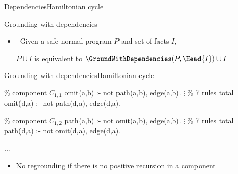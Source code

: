 \begin{frame}[shrink]{Dependencies}{Hamiltonian cycle}
  \begin{center}
    \DepGraph
  \end{center}
\end{frame}
\begin{frame}{Grounding with dependencies}
  \bigskip
  \begin{center}
  \end{center}
  \bigskip
  \begin{itemize}
  \item<2->  \ Given a safe normal program \(P\) and set of facts \(I\),

    \(P \cup I\) is equivalent to \(\GroundWithDependencies(P,\Head{I}) \cup I\)
  \end{itemize}
\end{frame}
\begin{frame}{Grounding with dependencies}{Hamiltonian cycle}
\begin{SemiVerbatim}{.9}
{\color{comment}\% component \(C_{1,1}\)}
omit(a,b) :- not path(a,b), \alert{edge(a,b)}.
          \(\vdots\) {\color{comment}\% 7 rules total}
omit(d,a) :- not path(d,a), \alert{edge(d,a)}.

{\color{comment}\% component \(C_{1,2}\)}
path(a,b) :- not omit(a,b), \alert{edge(a,b)}.
          \(\vdots\) {\color{comment}\% 7 rules total}
path(d,a) :- not omit(d,a), \alert{edge(d,a)}.

...
\end{SemiVerbatim}
\vspace{-.8cm}
\begin{itemize}
\item<2-> No regrounding if there is no positive recursion in a component
\end{itemize}
\smallskip
\end{frame}
